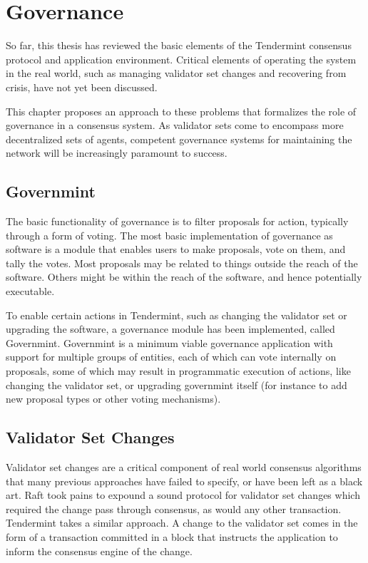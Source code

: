 \chapter{Governance}
\label{ch:governance}

So far, this thesis has reviewed the basic elements of the Tendermint consensus protocol and application environment.
Critical elements of operating the system in the real world, such as managing validator set changes
and recovering from crisis, have not yet been discussed. 

This chapter proposes an approach to these problems that formalizes the role of governance in a consensus system.
As validator sets come to encompass more decentralized sets of agents, competent governance systems 
for maintaining the network will be increasingly paramount to success.

\section{Governmint}

The basic functionality of governance is to filter proposals for action, typically through a form of voting.
The most basic implementation of governance as software is a module that enables users to make proposals,
vote on them, and tally the votes. Most proposals may be related to things outside the reach of the software.
Others might be within the reach of the software, and hence potentially executable.

To enable certain actions in Tendermint, such as changing the validator set or upgrading the software,
a governance module has been implemented, called Governmint.
Governmint is a minimum viable governance application with support for multiple groups of entities,
each of which can vote internally on proposals, some of which may result in programmatic execution of actions,
like changing the validator set, or upgrading governmint itself (for instance to add new proposal types or other voting mechanisms).

\section{Validator Set Changes}

Validator set changes are a critical component of real world consensus algorithms that many previous approaches have failed to specify, 
or have been left as a black art. 
Raft took pains to expound a sound protocol for validator set changes which required the change pass through consensus, as would any other transaction.
Tendermint takes a similar approach. 
A change to the validator set comes in the form of a transaction committed in a block that instructs the application to inform the consensus engine of the change.

